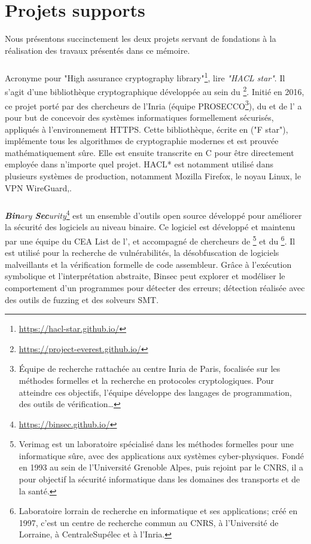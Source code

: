 \chapter*{Projets supports}
\label{chap:supports}

Nous présentons succinctement les deux projets servant de fondations à la réalisation des travaux présentés dans ce mémoire.

\subsection*{}
Acronyme pour "High assurance cryptography library"\footnote{\url{https://hacl-star.github.io/}}, lire \textit{"HACL star"}. Il s'agit d'une bibliothèque cryptographique développée au sein du \textbf{}\footnote{\url{https://project-everest.github.io/}}. Initié en 2016, ce projet porté par des chercheurs de l'Inria (équipe PROSECCO\footnote{Équipe de recherche rattachée au centre Inria de Paris, focalisée sur les méthodes formelles et la recherche en protocoles cryptologiques. Pour atteindre ces objectifs, l'équipe développe des langages de programmation, des outils de vérification\dots}), du  et de l' a pour but de concevoir des systèmes informatiques formellement sécurisés, appliqués à l'environnement HTTPS. Cette bibliothèque, écrite en  ("F star"), implémente tous les algorithmes de cryptographie modernes et est prouvée mathématiquement sûre. Elle est ensuite transcrite en C pour être directement employée dans n'importe quel projet. HACL* est notamment utilisé dans plusieurs systèmes de production, notamment Mozilla Firefox, le noyau Linux, le VPN WireGuard,\etc.


\subsection*{}
\textit{\textbf{Bin}ary \textbf{Sec}urity}\footnote{\url{https://binsec.github.io/}} est un ensemble d'outils open source développé pour améliorer la sécurité des logiciels au niveau binaire. Ce logiciel est développé et maintenu par une équipe du CEA List de l', et accompagné de chercheurs de \footnote{Verimag est un laboratoire spécialisé dans les méthodes formelles pour une informatique sûre, avec des applications aux systèmes cyber-physiques. Fondé en 1993 au sein de l'Université Grenoble Alpes, puis rejoint par le CNRS, il a pour objectif la sécurité informatique dans les domaines des transports et de la santé.} et du \footnote{Laboratoire lorrain de recherche en informatique et ses applications; créé en 1997, c'est un centre de recherche commun au CNRS, à l'Université de Lorraine, à CentraleSupélec et à l'Inria.}. Il est utilisé pour la recherche de vulnérabilités, la désobfuscation de logiciels malveillants et la vérification formelle de code assembleur. Grâce à l'exécution symbolique et l'interprétation abstraite, Binsec peut explorer et modéliser le comportement d'un programmes pour détecter des erreurs; détection réalisée avec des outils de fuzzing et des solveurs SMT.
